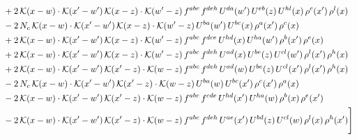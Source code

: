 \documentclass[9pt]{article}
\numberwithin{equation}{section}
\begin{document}
\begin{align}
&+2\,\mathcal{K}(x-w)\cdot\mathcal{K}(x'-w')\,\mathcal{K}(x-z)\cdot\mathcal{K}(w'-z)\,f^{abc}\,f^{deh}\,U^{da}(w')\,U^{eb}(z)\,U^{hl}(x)\,\rho^{c}(x')\,\rho^{l}(x)\notag\\
&-2\,N_{c}\,\mathcal{K}(x-w)\cdot\mathcal{K}(x'-w')\,\mathcal{K}(x-z)\cdot\mathcal{K}(w'-z)\,U^{ba}(w')\,U^{bc}(x)\,\rho^{a}(x')\,\rho^{c}(x)\notag\\
&+2\,\mathcal{K}(x-w)\cdot\mathcal{K}(x'-w')\,\mathcal{K}(x-z)\cdot\mathcal{K}(w'-z)\,f^{abc}\,f^{dce}\,U^{hd}(x)\,U^{ha}(w')\,\rho^{b}(x')\,\rho^{e}(x)\notag\\
&+2\,\mathcal{K}(x-w)\cdot\mathcal{K}(x'-w')\,\mathcal{K}(x-z)\cdot\mathcal{K}(w'-z)\,f^{abc}\,f^{deh}\,U^{ad}(x)\,U^{be}(z)\,U^{cl}(w')\,\rho^{l}(x')\,\rho^{h}(x)\notag\\
&+2\,\mathcal{K}(x-w)\cdot\mathcal{K}(x'-w')\,\mathcal{K}(x'-z)\cdot\mathcal{K}(w-z)\,f^{abc}\,f^{deh}\,U^{ad}(w)\,U^{be}(z)\,U^{cl}(x')\,\rho^{l}(x')\,\rho^{h}(x)\notag\\
&-2\,N_{c}\,\mathcal{K}(x-w)\cdot\mathcal{K}(x'-w')\,\mathcal{K}(x'-z)\cdot\mathcal{K}(w-z)\,U^{ba}(w)\,U^{bc}(x')\,\rho^{c}(x')\,\rho^{a}(x)\notag\\
&-2\,\mathcal{K}(x-w)\cdot\mathcal{K}(x'-w')\,\mathcal{K}(x'-z)\cdot\mathcal{K}(w-z)\,f^{abc}\,f^{cde}\,U^{hd}(x')\,U^{ha}(w)\,\rho^{b}(x)\,\rho^{e}(x')\notag\\
&-2\,\mathcal{K}(x-w)\cdot\mathcal{K}(x'-w')\,\mathcal{K}(x'-z)\cdot\mathcal{K}(w-z)\,f^{abc}\,f^{deh}\,U^{ae}(x')\,U^{bd}(z)\,U^{cl}(w)\,\rho^{l}(x)\,\rho^{h}(x')\Bigg]
\end{align}
\end{document}
